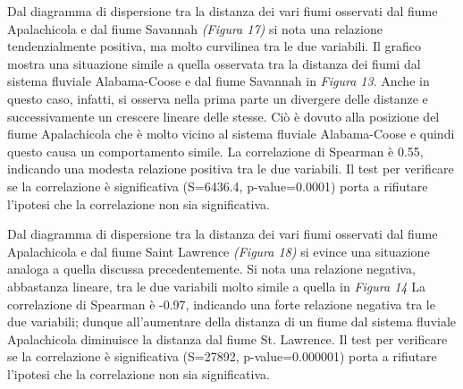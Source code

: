 \documentclass{article} %
\begin{document}
Dal diagramma di dispersione tra la distanza dei vari fiumi osservati dal fiume Apalachicola e dal fiume Savannah \textit{(Figura 17)} si nota una relazione tendenzialmente positiva, ma molto curvilinea tra le due variabili. 
Il grafico mostra una situazione simile a quella osservata tra la distanza dei fiumi dal sistema fluviale Alabama-Coose e dal fiume Savannah in \textit{Figura 13}. Anche in questo caso, infatti, si osserva nella prima parte un divergere delle distanze e successivamente un crescere lineare delle stesse. 
Ciò è dovuto alla posizione del fiume Apalachicola che è molto vicino al sistema fluviale Alabama-Coose e quindi questo causa un comportamento simile.
La correlazione di Spearman è 0.55, indicando una modesta relazione positiva tra le due variabili.  
Il test per verificare se la correlazione è significativa (S=6436.4, p-value=0.0001) porta a rifiutare l'ipotesi che la correlazione non sia significativa.

Dal diagramma di dispersione tra la distanza dei vari fiumi osservati dal fiume Apalachicola e dal fiume Saint Lawrence \textit{(Figura 18)} si evince una situazione analoga a quella discussa precedentemente.
Si nota una relazione negativa, abbastanza lineare, tra le due variabili molto simile a quella in \textit{Figura 14}
La correlazione di Spearman è -0.97, indicando una forte relazione negativa tra le due variabili; dunque all'aumentare della distanza di un fiume dal sistema fluviale Apalachicola diminuisce la distanza dal fiume St. Lawrence. 
Il test per verificare se la correlazione è significativa (S=27892, p-value=0.000001) porta a rifiutare l'ipotesi che la correlazione non sia significativa.
\end{document}

